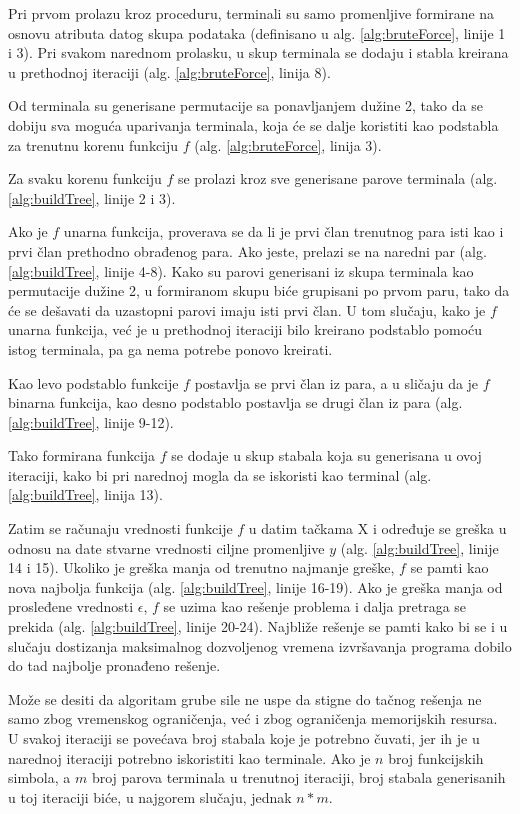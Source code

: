 \documentclass[main.tex]{subfiles}
\begin{document}
Pri prvom prolazu kroz proceduru, terminali su samo promenljive formirane na osnovu atributa datog skupa podataka (definisano u alg. \autoref{alg:bruteForce}, linije 1 i 3). Pri svakom narednom prolasku, u skup terminala se dodaju i stabla kreirana u prethodnoj iteraciji (alg. \autoref{alg:bruteForce}, linija 8). 

Od terminala su generisane permutacije sa ponavljanjem dužine 2, tako da se dobiju sva moguća uparivanja terminala, koja će se dalje koristiti kao podstabla za trenutnu korenu funkciju $f$ (alg. \autoref{alg:bruteForce}, linija 3).

Za svaku korenu funkciju $f$ se prolazi kroz sve generisane parove terminala (alg. \autoref{alg:buildTree}, linije 2 i 3).

Ako je $f$ unarna funkcija, proverava se da li je prvi član trenutnog para isti kao i prvi član prethodno obrađenog para. Ako jeste, prelazi se na naredni par (alg. \autoref{alg:buildTree}, linije 4-8). Kako su parovi generisani iz skupa terminala kao permutacije dužine 2, u formiranom skupu biće grupisani po prvom paru, tako da će se dešavati da uzastopni parovi imaju isti prvi član. U tom slučaju, kako je $f$ unarna funkcija, već je u prethodnoj iteraciji bilo kreirano podstablo pomoću istog terminala, pa ga nema potrebe ponovo kreirati.

Kao levo podstablo funkcije $f$ postavlja se prvi član iz para, a u sličaju da je $f$ binarna funkcija, kao desno podstablo postavlja se drugi član iz para (alg. \autoref{alg:buildTree}, linije 9-12).

Tako formirana funkcija $f$ se dodaje u skup stabala koja su generisana u ovoj iteraciji, kako bi pri narednoj mogla da se iskoristi kao terminal (alg. \autoref{alg:buildTree}, linija 13).

Zatim se računaju vrednosti funkcije $f$ u datim tačkama X i određuje se greška u odnosu na date stvarne vrednosti ciljne promenljive $y$ (alg. \autoref{alg:buildTree}, linije 14 i 15). Ukoliko je greška manja od trenutno najmanje greške, $f$ se pamti kao nova najbolja funkcija (alg. \autoref{alg:buildTree}, linije 16-19). Ako je greška manja od prosleđene vrednosti $\epsilon$, $f$ se uzima kao rešenje problema i dalja pretraga se prekida (alg. \autoref{alg:buildTree}, linije 20-24). %
Najbliže rešenje se pamti kako bi se i u slučaju dostizanja maksimalnog dozvoljenog vremena izvršavanja programa dobilo do tad najbolje pronađeno rešenje.

Može se desiti da algoritam grube sile ne uspe da stigne do tačnog rešenja ne samo zbog vremenskog ograničenja, već i zbog ograničenja memorijskih resursa. U svakoj iteraciji se povećava broj stabala koje je potrebno čuvati, jer ih je u narednoj iteraciji potrebno iskoristiti kao terminale. Ako je $n$ broj funkcijskih simbola, a $m$ broj parova terminala u trenutnoj iteraciji, broj stabala generisanih u toj iteraciji biće, u najgorem slučaju, jednak $n * m$.
\end{document}

